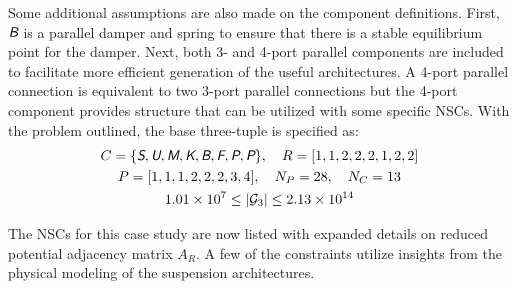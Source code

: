 Some additional assumptions are also made on the component definitions. First, $\xcolor{B}$ is a parallel damper and spring to ensure that there is a stable equilibrium point for the damper. Next, both 3- and 4-port parallel components are included to facilitate more efficient generation of the useful architectures. A 4-port parallel connection is equivalent to two 3-port parallel connections but the 4-port component provides structure that can be utilized with some specific NSCs. With the problem outlined, the base three-tuple is specified as:
\begin{gather*}
{C} = \{ \xcolor{S}, \xcolor{U}, \xcolor{M}, \xcolor{K}, \xcolor{B}, \xcolor{F}, \xcolor{P}, \xcolor{P} \}, \quad R =  [1,1,2,2,2,1,2,2] \\
{P} = [1,1,1,2,2,2,3,4], \quad N_P = 28, \quad N_C = 13 \\
1.01 \times 10^{7} \leq \abs*{\mathcal{G}_3} \leq 2.13 \times 10^{14}
\end{gather*}

The NSCs for this case study are now listed with expanded details on reduced potential adjacency matrix $A_R$. A few of the constraints utilize insights from the physical modeling of the suspension architectures.

